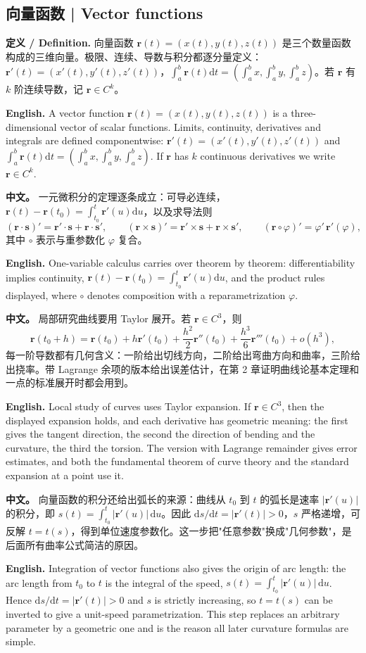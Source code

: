 \documentclass[UTF8,11pt,a4paper]{ctexart}
\newcommand{\APS}[2]{\par\noindent\textbf{中文。} #1\par\noindent\textbf{English.} #2\par\smallskip}
\newcommand{\EN}[1]{\par\noindent \textbf{English.} #1\par}
\newcommand{\DEF}[2]{\par\noindent\textbf{定义 / Definition.} #1\par\EN{#2}\par\smallskip}
\newcommand{\dd}{\mathrm{d}}
\newcommand{\br}{\mathbf{r}}
\newcommand{\bs}{\mathbf{s}}
\begin{document}
\subsection{向量函数 | Vector functions}
\DEF{向量函数 $\br(t)=(x(t),y(t),z(t))$ 是三个数量函数构成的三维向量。极限、连续、导数与积分都逐分量定义：$\br'(t)=(x'(t),y'(t),z'(t))$，$\int_a^b\br(t)\dd t=(\int_a^b x,\int_a^b y,\int_a^b z)$。若 $\br$ 有 $k$ 阶连续导数，记 $\br\in C^k$。}{A vector function $\br(t)=(x(t),y(t),z(t))$ is a three-dimensional vector of scalar functions. Limits, continuity, derivatives and integrals are defined componentwise: $\br'(t)=(x'(t),y'(t),z'(t))$ and $\int_a^b\br(t)\dd t=(\int_a^b x,\int_a^b y,\int_a^b z)$. If $\br$ has $k$ continuous derivatives we write $\br\in C^k$.}
\APS{一元微积分的定理逐条成立：可导必连续，$\br(t)-\br(t_0)=\int_{t_0}^t\br'(u)\dd u$，以及求导法则
\[
(\br\cdot\bs)'=\br'\cdot\bs+\br\cdot\bs',\qquad
(\br\times\bs)'=\br'\times\bs+\br\times\bs',\qquad
(\br\circ\varphi)'=\varphi'\,\br'(\varphi),
\]
其中 $\circ$ 表示与重参数化 $\varphi$ 复合。}{One-variable calculus carries over theorem by theorem: differentiability implies continuity, $\br(t)-\br(t_0)=\int_{t_0}^t\br'(u)\dd u$, and the product rules displayed, where $\circ$ denotes composition with a reparametrization $\varphi$.}
\APS{局部研究曲线要用 Taylor 展开。若 $\br\in C^3$，则
\[
\br(t_0+h)=\br(t_0)+h\br'(t_0)+\frac{h^2}{2}\br''(t_0)+\frac{h^3}{6}\br'''(t_0)+o(h^3),
\]
每一阶导数都有几何含义：一阶给出切线方向，二阶给出弯曲方向和曲率，三阶给出挠率。带 Lagrange 余项的版本给出误差估计，在第 2 章证明曲线论基本定理和一点的标准展开时都会用到。}{Local study of curves uses Taylor expansion. If $\br\in C^3$, then the displayed expansion holds, and each derivative has geometric meaning: the first gives the tangent direction, the second the direction of bending and the curvature, the third the torsion. The version with Lagrange remainder gives error estimates, and both the fundamental theorem of curve theory and the standard expansion at a point use it.}
\APS{向量函数的积分还给出弧长的来源：曲线从 $t_0$ 到 $t$ 的弧长是速率 $|\br'(u)|$ 的积分，即 $s(t)=\int_{t_0}^t|\br'(u)|\,\dd u$。因此 $\dd s/\dd t=|\br'(t)|>0$，$s$ 严格递增，可反解 $t=t(s)$，得到单位速度参数化。这一步把"任意参数"换成"几何参数"，是后面所有曲率公式简洁的原因。}{Integration of vector functions also gives the origin of arc length: the arc length from $t_0$ to $t$ is the integral of the speed, $s(t)=\int_{t_0}^t|\br'(u)|\,\dd u$. Hence $\dd s/\dd t=|\br'(t)|>0$ and $s$ is strictly increasing, so $t=t(s)$ can be inverted to give a unit-speed parametrization. This step replaces an arbitrary parameter by a geometric one and is the reason all later curvature formulas are simple.}
\end{document}
